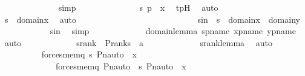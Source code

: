 \begin{isabellebody}
\ \ \ \ \ \ \ \ \ \ \ \ \isamarkupfalse%
\ simp\ \isanewline
\ \ \ \ \ \ \ \ \ \ \isamarkupfalse%
\ \isamarkupfalse%
\ {\isachardoublequoteopen}{\isacharless}{\kern0pt}s{\isacharcomma}{\kern0pt}\ p{\isachargreater}{\kern0pt}\ {\isasymin}\ x{\isachardoublequoteclose}\ \isamarkupfalse%
\ tpH\ \isamarkupfalse%
\ auto\ \isanewline
\ \ \ \ \ \ \ \ \ \ \isamarkupfalse%
\ \isamarkupfalse%
\ {\isachardoublequoteopen}s\ {\isasymin}\ domain{\isacharparenleft}{\kern0pt}x{\isacharparenright}{\kern0pt}{\isachardoublequoteclose}\ \isamarkupfalse%
\ auto\ \isanewline
\ \ \ \ \ \ \ \ \isamarkupfalse%
\isanewline
\ \ \ \ \ \ \ \ \isanewline
\ \ \ \ \ \ \ \ \isamarkupfalse%
\ sin\ {\isacharcolon}{\kern0pt}\ {\isachardoublequoteopen}s\ {\isasymin}\ domain{\isacharparenleft}{\kern0pt}x{\isacharparenright}{\kern0pt}\ {\isasymunion}\ domain{\isacharparenleft}{\kern0pt}y{\isacharparenright}{\kern0pt}{\isachardoublequoteclose}\ \isanewline
\ \ \ \ \ \ \ \ \ \ \isamarkupfalse%
\ s{\isacharprime}{\kern0pt}in\ \isamarkupfalse%
\ simp\ \isanewline
\ \ \ \ \ \ \ \ \ \ \isamarkupfalse%
\ domain{\isacharunderscore}{\kern0pt}lemma\ s{\isacharprime}{\kern0pt}pname\ xpname\ ypname\ \isamarkupfalse%
\ auto\ \isanewline
\isanewline
\ \ \ \ \ \ \ \ \isamarkupfalse%
\ \isamarkupfalse%
\ srank\ {\isacharcolon}{\kern0pt}\ {\isachardoublequoteopen}P{\isacharunderscore}{\kern0pt}rank{\isacharparenleft}{\kern0pt}s{\isacharparenright}{\kern0pt}\ {\isacharless}{\kern0pt}\ a{\isachardoublequoteclose}\ \isanewline
\ \ \ \ \ \ \ \ \ \ \isamarkupfalse%
\ srank{\isacharunderscore}{\kern0pt}lemma\ \isamarkupfalse%
\ auto\ \isanewline
\isanewline
\ \ \ \ \ \ \ \ \isamarkupfalse%
\ {\isachardoublequoteopen}forces{\isacharunderscore}{\kern0pt}mem{\isacharparenleft}{\kern0pt}q{\isacharprime}{\kern0pt}{\isacharcomma}{\kern0pt}\ s{\isacharprime}{\kern0pt}{\isacharcomma}{\kern0pt}\ Pn{\isacharunderscore}{\kern0pt}auto{\isacharparenleft}{\kern0pt}{\isasympi}{\isacharparenright}{\kern0pt}\ {\isacharbackquote}{\kern0pt}\ x{\isacharparenright}{\kern0pt}\ \isanewline
\ \ \ \ \ \ \ \ \ \ \ \ {\isasymlongleftrightarrow}\ forces{\isacharunderscore}{\kern0pt}mem{\isacharparenleft}{\kern0pt}{\isasympi}{\isacharbackquote}{\kern0pt}q{\isacharcomma}{\kern0pt}\ Pn{\isacharunderscore}{\kern0pt}auto{\isacharparenleft}{\kern0pt}{\isasympi}{\isacharparenright}{\kern0pt}\ {\isacharbackquote}{\kern0pt}\ s{\isacharcomma}{\kern0pt}\ Pn{\isacharunderscore}{\kern0pt}auto{\isacharparenleft}{\kern0pt}{\isasympi}{\isacharparenright}{\kern0pt}\ {\isacharbackquote}{\kern0pt}\ x{\isacharparenright}{\kern0pt}{\isachardoublequoteclose}\ \isamarkupfalse%

\end{isabellebody}
